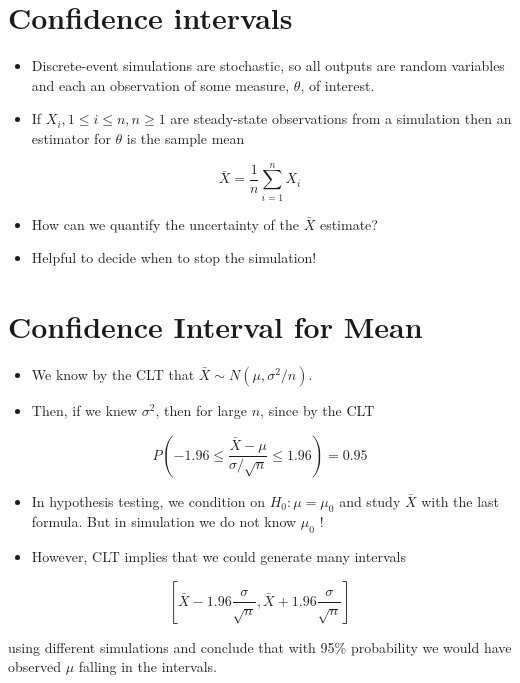 \documentclass[10pt]{article}
\begin{document}
\section*{Confidence intervals}
\begin{itemize}
  \item Discrete-event simulations are stochastic, so all outputs are random variables and each an observation of some measure, $\theta$, of interest.
  \item If $X_{i}, 1 \leq i \leq n, n \geq 1$ are steady-state observations from a simulation then an estimator for $\theta$ is the sample mean
\end{itemize}

$$
\bar{X}=\frac{1}{n} \sum_{i=1}^{n} X_{i}
$$

\begin{itemize}
  \item How can we quantify the uncertainty of the $\bar{X}$ estimate?
  \item Helpful to decide when to stop the simulation!
\end{itemize}

\section*{Confidence Interval for Mean}
\begin{itemize}
  \item We know by the CLT that $\bar{X} \sim N\left(\mu, \sigma^{2} / n\right)$.
  \item Then, if we knew $\sigma^{2}$, then for large $n$, since by the CLT
\end{itemize}

$$
P\left(-1.96 \leq \frac{\bar{X}-\mu}{\sigma / \sqrt{n}} \leq 1.96\right)=0.95
$$

\begin{itemize}
  \item In hypothesis testing, we condition on $H_{0}: \mu=\mu_{0}$ and study $\bar{X}$ with the last formula. But in simulation we do not know $\mu_{0}$ !
  \item However, CLT implies that we could generate many intervals
\end{itemize}

$$
\left[\bar{X}-1.96 \frac{\sigma}{\sqrt{n}}, \bar{X}+1.96 \frac{\sigma}{\sqrt{n}}\right]
$$

using different simulations and conclude that with 95\% probability we would have observed $\mu$ falling in the intervals.
\end{document}

